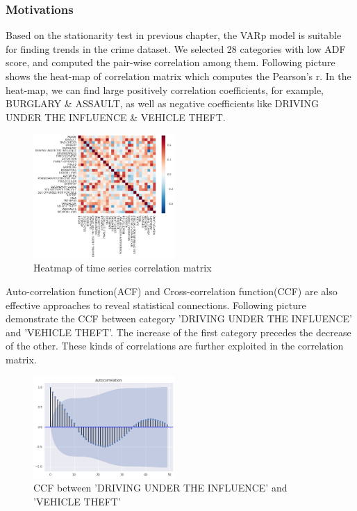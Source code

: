 \documentclass[11pt,conference]{IEEEtran}
\begin{document}
\subsubsection{Motivations}
Based on the stationarity test in previous chapter, the VAR{p} model is suitable for finding trends in the crime dataset. We selected 28 categories with low ADF score, and computed the pair-wise correlation among them. Following picture shows the heat-map of correlation matrix which computes the Pearson's r. In the heat-map, we can find large positively correlation coefficients, for example, BURGLARY \& ASSAULT, as well as negative coefficients like DRIVING UNDER THE INFLUENCE \& VEHICLE THEFT.
\begin{figure}%
\begin{center}
\includegraphics [width=0.48\textwidth]{pics/heat_map_time_series.png}
\caption{Heatmap of time series correlation matrix }
\end{center}
\end{figure}
Auto-correlation function(ACF) and Cross-correlation function(CCF) are also effective approaches to reveal statistical connections. Following picture demonstrate the CCF between category 'DRIVING UNDER THE INFLUENCE' and 'VEHICLE THEFT'. The increase of the first category precedes the decrease of the other. These kinds of correlations are further exploited in the correlation matrix.
\begin{figure}%
\begin{center}
\includegraphics [width=0.48\textwidth]{pics/ccf_DRIVING_UNDER_THE_INFLUENCE_VEHICLE_THEFT.png}
\caption{CCF between 'DRIVING UNDER THE INFLUENCE' and 'VEHICLE THEFT'}
\end{center}
\end{figure}
\end{document}
